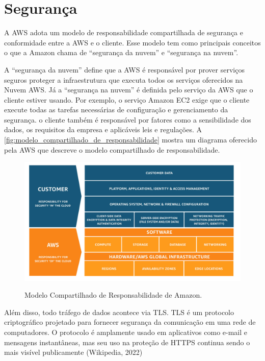 \section{Segurança}\label{section:aws_iot_security}

A AWS adota um modelo de responsabilidade compartilhada de segurança e conformidade entre a AWS e o cliente. Esse modelo tem como principais conceitos o que a Amazon chama de ``segurança da nuvem'' e ``segurança na nuvem''.

A ``segurança da nuvem'' define que a AWS é responsável por prover serviços seguros proteger a infraestrutura que executa todos os serviços oferecidos na Nuvem AWS. Já a ``segurança na nuvem'' é definida pelo serviço da AWS que o cliente estiver usando. Por exemplo, o serviço Amazon EC2 exige que o cliente execute todas as tarefas necessárias de configuração e gerenciamento da segurança. o cliente também é responsável por fatores como a sensibilidade dos dados, os requisitos da empresa e aplicáveis leis e regulações. A \autoref{fig:modelo_compartilhado_de_responsabilidade} mostra um diagrama oferecido pela AWS que descreve o modelo compartilhado de responsabilidade.

\begin{figure}[htbp]
	\centering
	\caption{Modelo Compartilhado de Responsabilidade de Amazon.}
	\includegraphics[scale=0.35]{Imagens/modelo_compartilhado_de_responsabilidade.jpg}
	\label{fig:modelo_compartilhado_de_responsabilidade}
\end{figure}

Além disso, todo tráfego de dados acontece via TLS. TLS é um protocolo criptográfico projetado para fornecer segurança da comunicação em uma rede de computadores. O protocolo é amplamente usado em aplicativos como e-mail e mensagens instantâneas, mas seu uso na proteção de HTTPS continua sendo o mais visível publicamente (Wikipedia, 2022)


